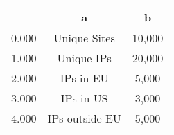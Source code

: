 \begin{tabular}{lcc}
  \toprule
  \toprule
   & a & b\\
  \midrule
  0.000 & Unique Sites & 10,000 \\
  1.000 & Unique IPs & 20,000 \\
  2.000 & IPs in EU & 5,000 \\
  3.000 & IPs in US & 3,000 \\
  4.000 & IPs outside EU & 5,000 \\
  \bottomrule
\end{tabular}
